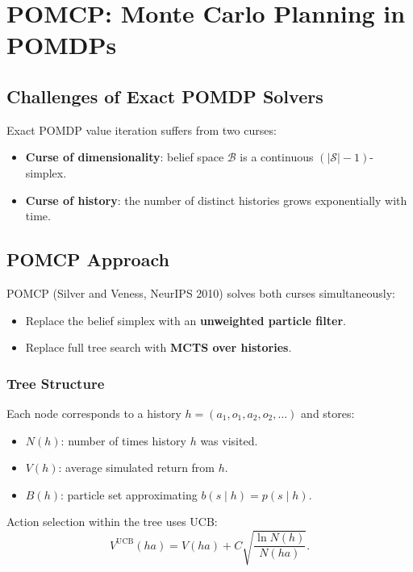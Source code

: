 \documentclass[11pt,a4paper]{article}
\theoremstyle{definition}
\theoremstyle{plain}
\theoremstyle{remark}
\begin{document}
\section{POMCP: Monte Carlo Planning in POMDPs}

\subsection{Challenges of Exact POMDP Solvers}

Exact POMDP value iteration suffers from two curses:
\begin{itemize}
    \item \textbf{Curse of dimensionality}: belief space $\mathcal{B}$ is a continuous $(|\mathcal{S}|-1)$-simplex.
    \item \textbf{Curse of history}: the number of distinct histories grows exponentially with time.
\end{itemize}

\subsection{POMCP Approach}

POMCP (Silver and Veness, NeurIPS 2010) solves both curses simultaneously:
\begin{itemize}
    \item Replace the belief simplex with an \textbf{unweighted particle filter}.
    \item Replace full tree search with \textbf{MCTS over histories}.
\end{itemize}

\subsubsection{Tree Structure}

Each node corresponds to a history $h = (a_1, o_1, a_2, o_2, \ldots)$ and stores:
\begin{itemize}
    \item $N(h)$: number of times history $h$ was visited.
    \item $V(h)$: average simulated return from $h$.
    \item $B(h)$: particle set approximating $b(s \mid h) = p(s \mid h)$.
\end{itemize}

Action selection within the tree uses UCB:
\[
    V^{\mathrm{UCB}}(ha) = V(ha) + C\sqrt{\frac{\ln N(h)}{N(ha)}}.
\]
\end{document}
